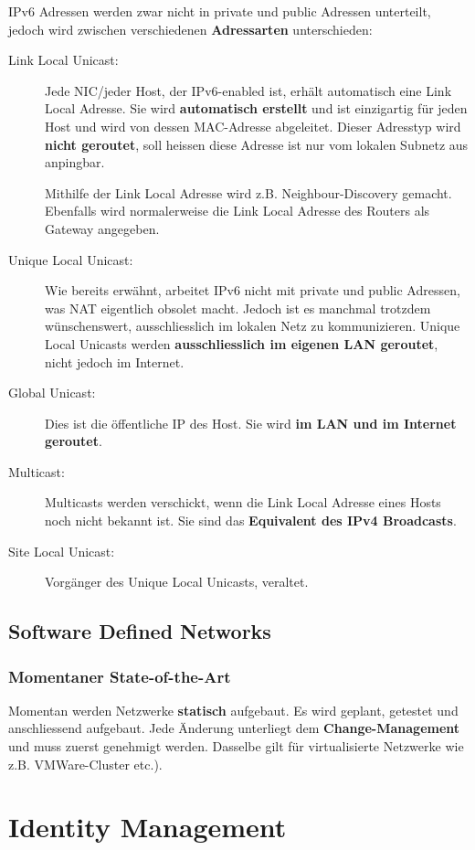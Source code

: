 \documentclass[a4paper, 11pt]{article}
\begin{document}
\noindent IPv6 Adressen werden zwar nicht in private und public Adressen unterteilt, jedoch wird zwischen verschiedenen \textbf{Adressarten} unterschieden:

\begin{description}
	\item[Link Local Unicast: ] Jede NIC/jeder Host, der IPv6-enabled ist, erhält automatisch eine Link Local Adresse. Sie wird \textbf{automatisch erstellt} und ist einzigartig für jeden Host und wird von dessen MAC-Adresse abgeleitet. Dieser Adresstyp wird \textbf{nicht geroutet}, soll heissen diese Adresse ist nur vom lokalen Subnetz aus anpingbar. 
	
	Mithilfe der Link Local Adresse wird z.B. Neighbour-Discovery gemacht. Ebenfalls wird normalerweise die Link Local Adresse des Routers als Gateway angegeben. 
	\item[Unique Local Unicast: ] Wie bereits erwähnt, arbeitet IPv6 nicht mit private und public Adressen, was NAT eigentlich obsolet macht. Jedoch ist es manchmal trotzdem wünschenswert, ausschliesslich im lokalen Netz zu kommunizieren. Unique Local Unicasts werden \textbf{ausschliesslich im eigenen LAN geroutet}, nicht jedoch im Internet.
	\item[Global Unicast: ] Dies ist die öffentliche IP des Host. Sie wird \textbf{im LAN und im Internet geroutet}.
	\item[Multicast: ] Multicasts werden verschickt, wenn die Link Local Adresse eines Hosts noch nicht bekannt ist. Sie sind das \textbf{Equivalent des IPv4 Broadcasts}.
	\item[Site Local Unicast: ] Vorgänger des Unique Local Unicasts, veraltet.
\end{description}

\subsection{Software Defined Networks}
\subsubsection{Momentaner State-of-the-Art}
Momentan werden Netzwerke \textbf{statisch} aufgebaut. Es wird geplant, getestet und anschliessend aufgebaut. Jede Änderung unterliegt dem \textbf{Change-Management} und muss zuerst genehmigt werden. Dasselbe gilt für virtualisierte Netzwerke wie z.B. VMWare-Cluster etc.).



\section{Identity Management}
\end{document}
